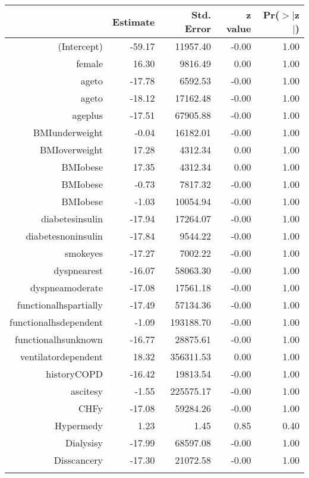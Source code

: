 \bigskip\bigskip
\centering
\begin{tabular}{rrrrr}
  \hline
 & Estimate & Std. Error & z value & Pr($>$$|$z$|$) \\ 
  \hline
(Intercept) & -59.17 & 11957.40 & -0.00 & 1.00 \\ 
  female & 16.30 & 9816.49 & 0.00 & 1.00 \\ 
  age\-65\-to\-74 & -17.78 & 6592.53 & -0.00 & 1.00 \\ 
  age\-75\-to\-84 & -18.12 & 17162.48 & -0.00 & 1.00 \\ 
  age\-85\-plus & -17.51 & 67905.88 & -0.00 & 1.00 \\ 
  BMI\-underweight & -0.04 & 16182.01 & -0.00 & 1.00 \\ 
  BMI\-overweight & 17.28 & 4312.34 & 0.00 & 1.00 \\ 
  BMI\-obese\-1 & 17.35 & 4312.34 & 0.00 & 1.00 \\ 
  BMI\-obese\-2 & -0.73 & 7817.32 & -0.00 & 1.00 \\ 
  BMI\-obese\-3 & -1.03 & 10054.94 & -0.00 & 1.00 \\ 
  diabetes\-insulin & -17.94 & 17264.07 & -0.00 & 1.00 \\ 
  diabetes\-noninsulin & -17.84 & 9544.22 & -0.00 & 1.00 \\ 
  smoke\-yes & -17.27 & 7002.22 & -0.00 & 1.00 \\ 
  dyspnea\-rest & -16.07 & 58063.30 & -0.00 & 1.00 \\ 
  dyspnea\-moderate & -17.08 & 17561.18 & -0.00 & 1.00 \\ 
  functional\-hs\-partially & -17.49 & 57134.36 & -0.00 & 1.00 \\ 
  functional\-hs\-dependent & -1.09 & 193188.70 & -0.00 & 1.00 \\ 
  functional\-hs\-unknown & -16.77 & 28875.61 & -0.00 & 1.00 \\ 
  ventilator\-dependent & 18.32 & 356311.53 & 0.00 & 1.00 \\ 
  history\-COPD & -16.42 & 19813.54 & -0.00 & 1.00 \\ 
  ascites\-y & -1.55 & 225575.17 & -0.00 & 1.00 \\ 
  CHF\-y & -17.08 & 59284.26 & -0.00 & 1.00 \\ 
  Hyper\-med\-y & 1.23 & 1.45 & 0.85 & 0.40 \\ 
  Dialysis\-y & -17.99 & 68597.08 & -0.00 & 1.00 \\ 
  Diss\-cancer\-y & -17.30 & 21072.58 & -0.00 & 1.00 \\ 
$$
\end{tabular}
